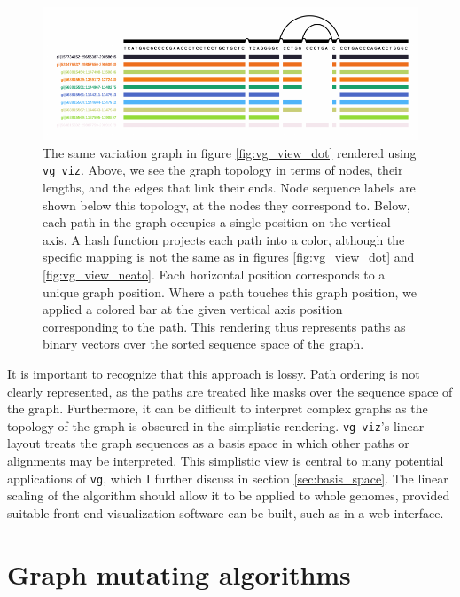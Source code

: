 \begin{figure}[htbp!] 
\centering    
\includegraphics[width=1.0\textwidth]{Chapter2/Figs/vg_viz_H-3136.pdf}
\caption[Linearized variation graph visualization]{
  The same variation graph in figure \ref{fig:vg_view_dot} rendered using {\tt vg viz}.
  Above, we see the graph topology in terms of nodes, their lengths, and the edges that link their ends.
  Node sequence labels are shown below this topology, at the nodes they correspond to.
  Below, each path in the graph occupies a single position on the vertical axis.
  A hash function projects each path into a color, although the specific mapping is not the same as in figures \ref{fig:vg_view_dot} and \ref{fig:vg_view_neato}.
  Each horizontal position corresponds to a unique graph position.
  Where a path touches this graph position, we applied a colored bar at the given vertical axis position corresponding to the path.
  This rendering thus represents paths as binary vectors over the sorted sequence space of the graph.
}
\label{fig:vg_viz}
\end{figure}

It is important to recognize that this approach is lossy.
Path ordering is not clearly represented, as the paths are treated like masks over the sequence space of the graph.
Furthermore, it can be difficult to interpret complex graphs as the topology of the graph is obscured in the simplistic rendering.
{\tt vg viz}'s linear layout treats the graph sequences as a basis space in which other paths or alignments may be interpreted.
This simplistic view is central to many potential applications of {\tt vg}, which I further discuss in section \ref{sec:basis_space}.
The linear scaling of the algorithm should allow it to be applied to whole genomes, provided suitable front-end visualization software can be built, such as in a web interface.

\section{Graph mutating algorithms}


